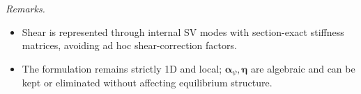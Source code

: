 \emph{Remarks.}\;
\begin{itemize}
\item Shear is represented through internal SV modes with section-exact stiffness matrices, avoiding ad hoc shear-correction factors.
\item The formulation remains strictly 1D and local; \(\bm\alpha_{\psi},\bm\eta\) are algebraic and can be kept or eliminated without affecting equilibrium structure.
\end{itemize}

